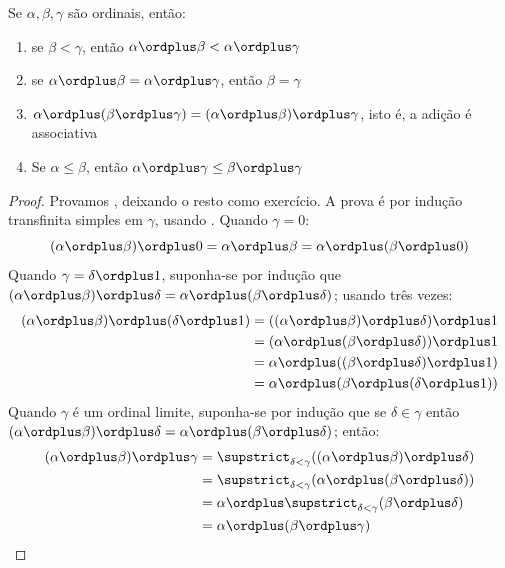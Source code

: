 \documentclass[../../../include/open-logic-section]{subfiles}
\begin{document}
\begin{lem}
Se $\alpha, \beta, \gamma$ são ordinais, então:
\begin{enumerate}
	\item{} se $\beta < \gamma$, então $\alpha
	\ordplus  \beta < \alpha \ordplus  \gamma$
	\item{} se $\alpha \ordplus  \beta =
	\alpha\ordplus \gamma$, então $\beta = \gamma$
	\item{}  $\alpha \ordplus  (\beta \ordplus
	\gamma) = (\alpha \ordplus  \beta) \ordplus  \gamma$, isto é,
	a adição é associativa
	\item{}  Se $\alpha \leq \beta$, então $\alpha
	\ordplus  \gamma \leq \beta \ordplus \gamma$
\end{enumerate}
\end{lem}

\begin{proof}
Provamos , deixando o resto como exercício. A
prova é por indução transfinita simples em $\gamma$, usando
. Quando $\gamma = 0$:
\[
(\alpha \ordplus  \beta) \ordplus  0 = \alpha \ordplus  \beta  = \alpha \ordplus  (\beta \ordplus  0)
\]
Quando $\gamma = \delta\ordplus 1$, suponha-se por indução que $(\alpha
\ordplus  \beta) \ordplus  \delta = \alpha \ordplus  (\beta \ordplus
\delta)$; usando  três vezes:
\begin{align*}
	(\alpha \ordplus  \beta) \ordplus  (\delta \ordplus  1) & = ((\alpha \ordplus  \beta) \ordplus  \delta)\ordplus 1\\
	& = (\alpha \ordplus  (\beta \ordplus  \delta)) \ordplus  1\\
	& = \alpha \ordplus  ((\beta \ordplus  \delta)\ordplus 1)\\
	& = \alpha \ordplus  (\beta \ordplus  (\delta\ordplus 1))
\end{align*}
Quando $\gamma$ é um ordinal limite, suponha-se por indução que se
$\delta \in \gamma$ então $(\alpha \ordplus  \beta) \ordplus  \delta =
\alpha \ordplus  (\beta \ordplus  \delta)$; então:
\begin{align*}
	(\alpha \ordplus  \beta) \ordplus  \gamma & = \supstrict_{\delta < \gamma}((\alpha \ordplus  \beta) \ordplus  \delta) \\
	&= \supstrict_{\delta < \gamma}(\alpha \ordplus  (\beta \ordplus  \delta))\\
	&= \alpha \ordplus  \supstrict_{\delta < \gamma}(\beta \ordplus  \delta)\\
	& = \alpha \ordplus  (\beta \ordplus  \gamma)
\end{align*}
\end{proof}
\end{document}

